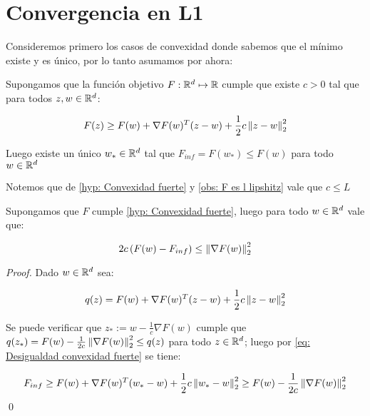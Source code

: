 \chapter{Convergencia en L1}\label{ch:convergenciaL1}

Consideremos primero los casos de convexidad donde sabemos que el m\'inimo existe y es \'unico, por lo tanto asumamos por ahora:

\begin{hyp}
	\label{hyp: Convexidad fuerte}
	Supongamos que la funci\'on objetivo $F : {\mathbb{R}}^d \mapsto {\mathbb{R}}$ cumple que existe $c >0$ tal que para todos $z,w \in {\mathbb{R}}^d$:
	
	\begin{equation}
		F(z) \geq F(w) + \nabla F(w)^T (z-w) + \frac{1}{2} c \left\lVert z-w\right\rVert_2^2
	\end{equation}
	
	Luego existe un \'unico $w_{*} \in {\mathbb{R}}^d$ tal que $F_{inf} = F(w_*) \leq F(w)$ para todo $w \in {\mathbb{R}}^d$
	
\end{hyp}

Notemos que de \ref{hyp: Convexidad fuerte} y \ref{obs: F es l lipshitz} vale que $c \leq L$ 

\begin{lemma}
	\label{eq: Desigualdad convexidad fuerte}
	Supongamos que $F$ cumple \ref{hyp: Convexidad fuerte}, luego para todo $w \in {\mathbb{R}}^d$ vale que:
	
	\begin{equation}
		2c\left(F(w) - F_{inf}\right) \leq \left\lVert\nabla F(w)\right\rVert_2^2
	\end{equation}
	
\end{lemma}

\begin{proof}
	Dado $w \in {\mathbb{R}}^d$ sea:
	
	\begin{equation*}
		q(z) = F(w) + \nabla F(w)^T (z-w) + \frac{1}{2} c \left\lVert z-w\right\rVert_2^2
	\end{equation*}
	
	Se puede verificar que $z_* := w - \frac{1}{c} \nabla F(w)$ cumple que $q(z_*) = F(w) - \frac{1}{2c} \left\lVert\nabla F(w)\right\rVert_2^2 \leq q(z)$ para todo $z \in {\mathbb{R}}^d$; luego por \ref{eq: Desigualdad convexidad fuerte} se tiene:
	
	\begin{equation*}
		F_{inf} \geq F(w) + \nabla F(w)^T (w_*-w) + \frac{1}{2} c \left\lVert w_*-w\right\rVert_2^2 \geq F(w) - \frac{1}{2c} \left\lVert\nabla F(w)\right\rVert_2^2 
	\end{equation*}
	\qed
\end{proof}

